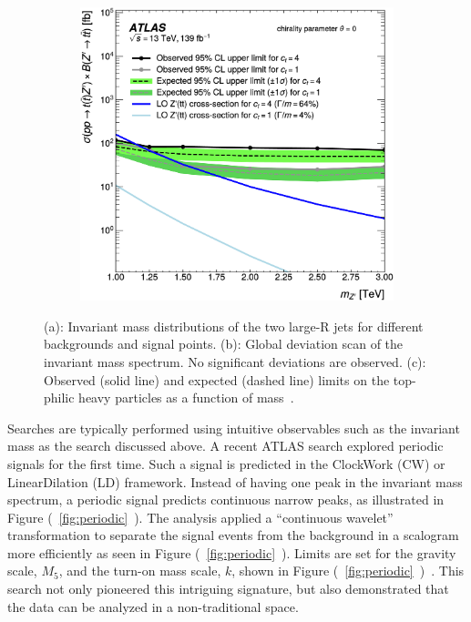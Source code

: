 \documentclass{moriond}
\begin{document}
\begin{figure}[htp]
\begin{subfigure}[b]{0.25\textwidth}
         \label{fig:bump}
     \end{subfigure}
     \begin{subfigure}[b]{0.25\textwidth}
         \centering
         \includegraphics[width=\textwidth]{tttt}
         \label{fig:ttttlimits}
     \end{subfigure}
        \caption{(a): Invariant mass distributions of the two large-R jets for different backgrounds and signal points. (b): Global deviation scan of the invariant mass spectrum. No significant deviations are observed. (c): Observed (solid line) and expected (dashed line) limits on the top-philic heavy particles as a function of mass~\cite{tttt}.}
        \label{fig:tttt}
\end{figure}

Searches are typically performed using intuitive observables such as the
invariant mass as the search discussed above. A recent ATLAS search explored
periodic signals for the first time. Such a signal is predicted in the
ClockWork (CW) or LinearDilation (LD) framework. Instead of having one peak in
the invariant mass spectrum, a periodic signal predicts continuous narrow
peaks, as illustrated in Figure (~\ref{fig:periodic}~). The
analysis applied a ``continuous wavelet'' transformation to separate the signal
events from the background in a scalogram more efficiently as seen in Figure
(~\ref{fig:periodic}~). Limits are set for the gravity scale,
$M_{5}$, and the turn-on mass scale, $k$, shown in Figure
(~\ref{fig:periodic}~)~\cite{period}. This search not
only pioneered this intriguing signature, but also demonstrated that the data
can be analyzed in a non-traditional space.\\        
\end{document}
